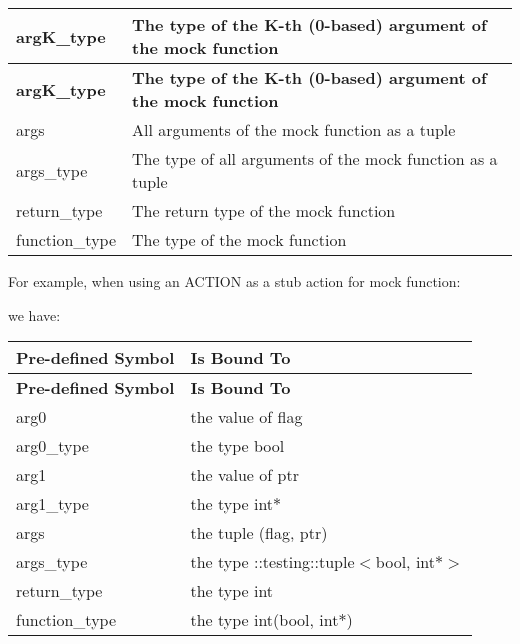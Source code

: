 \tabulinesep=1mm
\begin{longtabu}spread 0pt [c]{*{2}{|X[-1]}|}
\hline
\cellcolor{\tableheadbgcolor}\textbf{ {\ttfamily arg\+K\+\_\+type}  }&\cellcolor{\tableheadbgcolor}\textbf{ The type of the K-\/th (0-\/based) argument of the mock function   }\\
\endfirsthead
\hline
\endfoot
\hline
\cellcolor{\tableheadbgcolor}\textbf{ {\ttfamily arg\+K\+\_\+type}  }&\cellcolor{\tableheadbgcolor}\textbf{ The type of the K-\/th (0-\/based) argument of the mock function   }\\
\endhead
{\ttfamily args}  &All arguments of the mock function as a tuple   \\
{\ttfamily args\+\_\+type}  &The type of all arguments of the mock function as a tuple   \\
{\ttfamily return\+\_\+type}  &The return type of the mock function   \\
{\ttfamily function\+\_\+type}  &The type of the mock function   \\
\end{longtabu}


For example, when using an {\ttfamily A\+C\+T\+I\+ON} as a stub action for mock function\+: 
\begin{DoxyCode}{0}
\end{DoxyCode}
 we have\+:

\tabulinesep=1mm
\begin{longtabu}spread 0pt [c]{*{2}{|X[-1]}|}
\hline
\cellcolor{\tableheadbgcolor}\textbf{ {\bfseries Pre-\/defined Symbol}  }&\cellcolor{\tableheadbgcolor}\textbf{ {\bfseries Is Bound To}   }\\
\endfirsthead
\hline
\endfoot
\hline
\cellcolor{\tableheadbgcolor}\textbf{ {\bfseries Pre-\/defined Symbol}  }&\cellcolor{\tableheadbgcolor}\textbf{ {\bfseries Is Bound To}   }\\
\endhead
{\ttfamily arg0}  &the value of {\ttfamily flag}   \\
{\ttfamily arg0\+\_\+type}  &the type {\ttfamily bool}   \\
{\ttfamily arg1}  &the value of {\ttfamily ptr}   \\
{\ttfamily arg1\+\_\+type}  &the type {\ttfamily int$\ast$}   \\
{\ttfamily args}  &the tuple {\ttfamily (flag, ptr)}   \\
{\ttfamily args\+\_\+type}  &the type {\ttfamily \+::testing\+::tuple$<$bool, int$\ast$$>$}   \\
{\ttfamily return\+\_\+type}  &the type {\ttfamily int}   \\
{\ttfamily function\+\_\+type}  &the type {\ttfamily int(bool, int$\ast$)}   \\
\end{longtabu}


